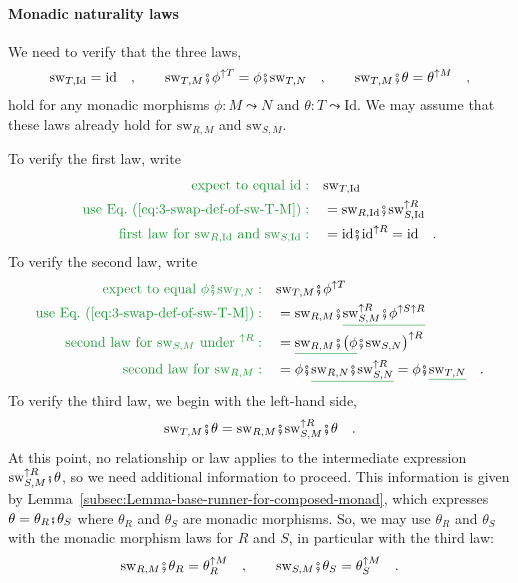 \paragraph{Monadic naturality laws}

We need to verify that the three laws,
\[
\text{sw}_{T,\text{Id}}=\text{id}\quad,\quad\quad\text{sw}_{T,M}\bef\phi^{\uparrow T}=\phi\bef\text{sw}_{T,N}\quad,\quad\quad\text{sw}_{T,M}\bef\theta=\theta^{\uparrow M}\quad,
\]
hold for any monadic morphisms $\phi:M\leadsto N$ and $\theta:T\leadsto\text{Id}$.
We may assume that these laws already hold for $\text{sw}_{R,M}$
and $\text{sw}_{S,M}$.

To verify the first law, write
\begin{align*}
{\color{greenunder}\text{expect to equal }\text{id}:}\quad & \text{sw}_{T,\text{Id}}\\
{\color{greenunder}\text{use Eq.~(\ref{eq:3-swap-def-of-sw-T-M})}:}\quad & =\text{sw}_{R,\text{Id}}\bef\text{sw}_{S,\text{Id}}^{\uparrow R}\\
{\color{greenunder}\text{first law for }\text{sw}_{R,\text{Id}}\text{ and }\text{sw}_{S,\text{Id}}:}\quad & =\text{id}\bef\text{id}^{\uparrow R}=\text{id}\quad.
\end{align*}
To verify the second law, write
\begin{align*}
{\color{greenunder}\text{expect to equal }\phi\bef\text{sw}_{T,N}:}\quad & \text{sw}_{T,M}\bef\phi^{\uparrow T}\\
{\color{greenunder}\text{use Eq.~(\ref{eq:3-swap-def-of-sw-T-M})}:}\quad & =\text{sw}_{R,M}\bef\gunderline{\text{sw}_{S,M}^{\uparrow R}\bef\phi^{\uparrow S\uparrow R}}\\
{\color{greenunder}\text{second law for }\text{sw}_{S,M}\text{ under }^{\uparrow R}:}\quad & =\gunderline{\text{sw}_{R,M}\bef\big(\phi}\bef\text{sw}_{S,N}\big)^{\uparrow R}\\
{\color{greenunder}\text{second law for }\text{sw}_{R,M}:}\quad & =\phi\bef\gunderline{\text{sw}_{R,N}\bef\text{sw}_{S,N}^{\uparrow R}}=\phi\bef\gunderline{\text{sw}_{T,N}}\quad.
\end{align*}
To verify the third law, we begin with the left-hand side,
\[
\text{sw}_{T,M}\bef\theta=\text{sw}_{R,M}\bef\text{sw}_{S,M}^{\uparrow R}\bef\theta\quad.
\]
At this point, no relationship or law applies to the intermediate
expression $\text{sw}_{S,M}^{\uparrow R}\bef\theta$, so we need additional
information to proceed. This information is given by Lemma~\ref{subsec:Lemma-base-runner-for-composed-monad},
which expresses $\theta=\theta_{R}\bef\theta_{S}$ where $\theta_{R}$
and $\theta_{S}$ are monadic morphisms. So, we may use $\theta_{R}$
and $\theta_{S}$ with the monadic morphism laws for $R$ and $S$,
in particular with the third law:
\[
\text{sw}_{R,M}\bef\theta_{R}=\theta_{R}^{\uparrow M}\quad,\quad\quad\text{sw}_{S,M}\bef\theta_{S}=\theta_{S}^{\uparrow M}\quad.
\]

